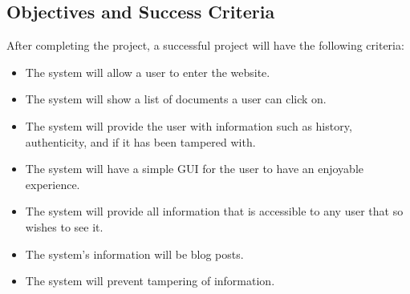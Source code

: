 \subsection{Objectives and Success Criteria} %

After completing the project, a successful project will have the following criteria:
\begin{itemize}
	\item The system will allow a user to enter the website.
	\item The system will show a list of documents a user can click on.
	\item The system will provide the user with information such as history, authenticity, and if it has been tampered with.
	\item The system will have a simple GUI for the user to have an enjoyable experience.
	\item The system will provide all information that is accessible to any user that so wishes to see it.
	\item The system's information will be blog posts.
	\item The system will prevent tampering of information.
\end{itemize} %
